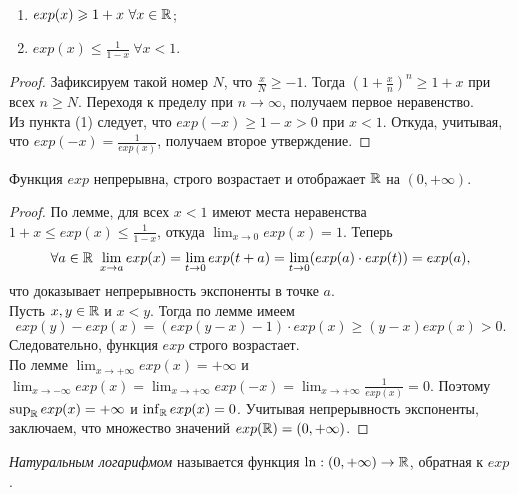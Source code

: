     \begin{lemma} \ \\
        \begin{enumerate}
            \item $exp(x) \geqslant 1 + x \ \forall x \in \mathbb{R}$;
            \item $exp(x) \leq \frac{1}{1 - x} \ \forall x < 1$.
        \end{enumerate}
    \end{lemma}

    \begin{proof}
        Зафиксируем такой номер $N$, что $\frac{x}{N} \geq -1$. Тогда $(1 + \frac{x}{n})^{n} \geq 1 + x$ при всех $n \geq N$. Переходя к пределу при $n \to \infty$, получаем первое неравенство.\\
        Из пункта (1) следует, что $exp(-x) \geq 1 - x > 0$ при $x < 1$. Откуда, учитывая, что $exp(-x) = \frac{1}{exp(x)}$, получаем второе утверждение.
    \end{proof}

    \begin{theorem}
        Функция $exp$ непрерывна, строго возрастает и отображает $\mathbb{R}$ на $(0, +\infty)$.
    \end{theorem}

    \begin{proof}
        По лемме, для всех $x < 1$ имеют места неравенства $1 + x \leq exp(x) \leq \frac{1}{1 - x}$, откуда $\lim_{x \to 0}exp(x) = 1$. Теперь 
        \[\forall a \in \mathbb{R} \ \lim_{x \to a}exp(x) = \lim_{t \to 0}exp(t + a) = \lim_{t \to 0}(exp(a) \cdot exp(t)) = exp(a),\]
        что доказывает непрерывность экспоненты в точке $a$.\\
        Пусть $x, y \in \mathbb{R}$ и $x < y$. Тогда по лемме имеем
        \[exp(y) - exp(x) = \left(exp(y - x) - 1\right) \cdot exp(x) \geq (y - x) exp(x) > 0.\]
        Следовательно, функция $exp$ строго возрастает.\\
        По лемме $\lim_{x \to +\infty} exp(x) = +\infty$ и $\lim_{x \to -\infty} exp(x) = \lim_{x \to +\infty} exp(-x) = \lim_{x \to +\infty} \frac{1}{exp(x)} = 0$. Поэтому $\sup_{\mathbb{R}}exp(x) = +\infty$ и $\inf_{\mathbb{R}} exp(x) = 0$. Учитывая непрерывность экспоненты, заключаем, что множество значений $exp(\mathbb{R}) = (0, +\infty)$.
    \end{proof}

    \begin{definition}
        \textit{Натуральным логарифмом} называется функция $\ln: (0, +\infty) \to \mathbb{R}$, обратная к $exp$.
    \end{definition}

